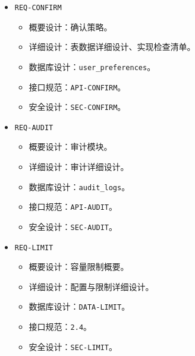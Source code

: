 \documentclass[
  a4paper,
  UTF8]{ctexart}
\providecommand{\tightlist}{%
  \setlength{\itemsep}{0pt}\setlength{\parskip}{0pt}}
\begin{document}
\begin{itemize}
  \begin{itemize}
  \tightlist
  \item
    概要设计：错误模型。
  \item
    详细设计：请求处理链路、\texttt{errorMiddleware}。
  \item
    数据库设计：\texttt{audit\_logs}。
  \item
    接口规范：\texttt{API-ERROR}。
  \item
    安全设计：\texttt{SEC-AUDIT}。
  \end{itemize}
\item
  \texttt{REQ-CONFIRM}

  \begin{itemize}
  \tightlist
  \item
    概要设计：确认策略。
  \item
    详细设计：表数据详细设计、实现检查清单。
  \item
    数据库设计：\texttt{user\_preferences}。
  \item
    接口规范：\texttt{API-CONFIRM}。
  \item
    安全设计：\texttt{SEC-CONFIRM}。
  \end{itemize}
\item
  \texttt{REQ-AUDIT}

  \begin{itemize}
  \tightlist
  \item
    概要设计：审计模块。
  \item
    详细设计：审计详细设计。
  \item
    数据库设计：\texttt{audit\_logs}。
  \item
    接口规范：\texttt{API-AUDIT}。
  \item
    安全设计：\texttt{SEC-AUDIT}。
  \end{itemize}
\item
  \texttt{REQ-LIMIT}

  \begin{itemize}
  \tightlist
  \item
    概要设计：容量限制概要。
  \item
    详细设计：配置与限制详细设计。
  \item
    数据库设计：\texttt{DATA-LIMIT}。
  \item
    接口规范：\texttt{2.4}。
  \item
    安全设计：\texttt{SEC-LIMIT}。
  \end{itemize}
\end{itemize}
\end{document}
